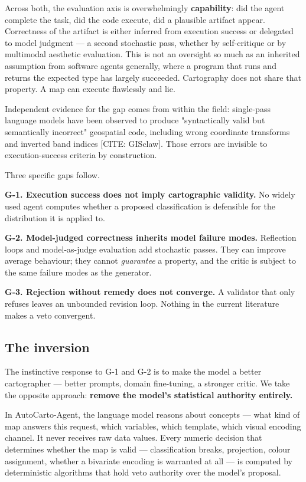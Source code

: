 Across both, the evaluation axis is overwhelmingly \textbf{capability}: did the agent complete the task, did the code execute, did a plausible artifact appear. Correctness of the artifact is either inferred from execution success or delegated to model judgment --- a second stochastic pass, whether by self-critique or by multimodal aesthetic evaluation. This is not an oversight so much as an inherited assumption from software agents generally, where a program that runs and returns the expected type has largely succeeded. Cartography does not share that property. A map can execute flawlessly and lie.

Independent evidence for the gap comes from within the field: single-pass language models have been observed to produce "syntactically valid but semantically incorrect" geospatial code, including wrong coordinate transforms and inverted band indices [CITE: GISclaw]. Those errors are invisible to execution-success criteria by construction.

Three specific gaps follow.

\textbf{G-1. Execution success does not imply cartographic validity.} No widely used agent computes whether a proposed classification is defensible for the distribution it is applied to.

\textbf{G-2. Model-judged correctness inherits model failure modes.} Reflection loops and model-as-judge evaluation add stochastic passes. They can improve average behaviour; they cannot \emph{guarantee} a property, and the critic is subject to the same failure modes as the generator.

\textbf{G-3. Rejection without remedy does not converge.} A validator that only refuses leaves an unbounded revision loop. Nothing in the current literature makes a veto convergent.

\subsection{The inversion}
The instinctive response to G-1 and G-2 is to make the model a better cartographer --- better prompts, domain fine-tuning, a stronger critic. We take the opposite approach: \textbf{remove the model's statistical authority entirely.}

In AutoCarto-Agent, the language model reasons about concepts --- what kind of map answers this request, which variables, which template, which visual encoding channel. It never receives raw data values. Every numeric decision that determines whether the map is valid --- classification breaks, projection, colour assignment, whether a bivariate encoding is warranted at all --- is computed by deterministic algorithms that hold veto authority over the model's proposal.

